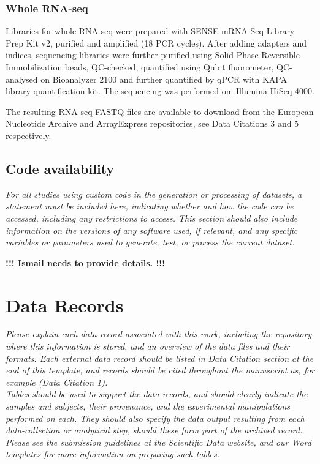 \documentclass[english]{article}
\begin{document}
\subsubsection*{Whole RNA-seq}
Libraries for whole RNA-seq were prepared with SENSE mRNA-Seq Library Prep Kit v2, purified and amplified (18 PCR cycles). After adding adapters and indices, sequencing libraries were further purified using Solid Phase Reversible Immobilization beads, QC-checked, quantified using Qubit fluorometer, QC-analysed on Bioanalyzer 2100 and further quantified by qPCR with KAPA library quantification kit. The sequencing was performed om Illumina HiSeq 4000.

The resulting RNA-seq FASTQ files are available to download from the European Nucleotide Archive and ArrayExpress repositories, see Data Citations 3 and 5 respectively.

\subsection*{Code availability}

\textit{For all studies using custom code in the generation or processing of datasets, 
a statement must be included here, indicating whether and how the code can be 
accessed, including any restrictions to access. This section should also include 
information on the versions of any software used, if relevant, and any specific 
variables or parameters used to generate, test, or process the current dataset.}

\colorbox{BurntOrange}{\textbf{!!! Ismail needs to provide details. !!!}}


\section*{Data Records}

\textit{Please explain each data record associated with this work, including
the repository where this information is stored, and an overview of
the data files and their formats. Each external data record should
be listed in Data Citation section at the end of this template, and 
records should be cited throughout the manuscript as, for example 
(Data Citation 1).\\
Tables should be used to support the data records, and should clearly indicate 
the samples and subjects, their provenance, and the experimental manipulations 
performed on each. They should also specify the data output resulting from each 
data-collection or analytical step, should these form part of the archived record. 
Please see the submission guidelines at the \emph{Scientific Data} website, and 
our Word templates for more information on preparing such tables.}
\end{document}
